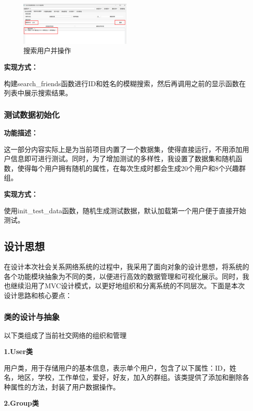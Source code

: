 \documentclass[12pt,a4paper]{article}
\begin{document}
\begin{figure}[H]
    \centering
    \includegraphics[width=0.5\textwidth]{pt2-9.png}
    \caption{搜索用户并操作}
\end{figure}

\noindent\textbf{实现方式：}

构建search\_friends函数进行ID和姓名的模糊搜索，然后再调用之前的显示函数在列表中展示搜索结果。

\subsubsection{测试数据初始化}

\noindent\textbf{功能描述：}

这一部分内容实际上是为当前项目内置了一个数据集，使得直接运行，不用添加用户信息即可进行测试。同时，为了增加测试的多样性，我设置了数据集和随机函数，使得每个用户拥有随机的属性，在每次生成时都会生成20个用户和8个兴趣群组。

\noindent\textbf{实现方式：}

使用init\_test\_data函数，随机生成测试数据，默认加载第一个用户便于直接开始测试。

\subsection{设计思想}

在设计本次社会关系网络系统的过程中，我采用了面向对象的设计思想，将系统的各个功能模块抽象为不同的类，以便进行高效的数据管理和可视化展示。同时，我也继续沿用了MVC设计模式，以更好地组织和分离系统的不同层次。下面是本次设计思路和核心要点：

\subsubsection{类的设计与抽象}

以下类组成了当前社交网络的组织和管理

\noindent\textbf{1.User类}

用户类，用于存储用户的基本信息，表示单个用户，包含了以下属性：ID，姓名，地区，学校，工作单位，爱好，好友，加入的群组。该类提供了添加和删除各种属性的方法，封装了用户数据操作。

\noindent\textbf{2.Group类}
\end{document}
